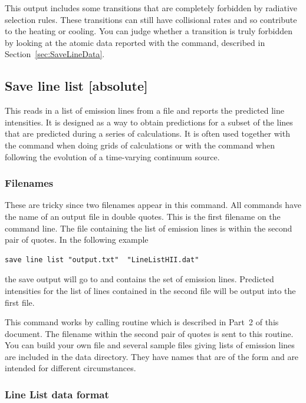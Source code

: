 This output includes some transitions that are completely forbidden by
radiative selection rules.  These transitions can still have collisional
rates and so contribute to the heating or cooling.  You can judge
whether a transition is truly forbidden by looking at the atomic data
reported with the  command, described in
Section~\ref{sec:SaveLineData}.

\subsection{Save line list [absolute]}
\label{sec:save_line_list}

This reads in a list of emission lines from a file and reports the
predicted line intensities.  It is designed as a way to obtain predictions
for a subset of the lines that are predicted during a series of calculations.
It is often used together with the  command
when doing grids of calculations or with the  command
when following the evolution of a time-varying
continuum source.

\subsubsection{Filenames}  
These are tricky since two filenames appear in this command.
All  commands have the name of an output file
in double quotes.
This is the first filename on the command line.
The file containing the list
of emission lines is within the second pair of quotes.  In the following
example
\begin{verbatim}
save line list "output.txt"  "LineListHII.dat"
\end{verbatim}
the save output will go to 
and  contains the
set of emission lines.
Predicted intensities for the list of lines contained
in the second file will be output into the first file.
 
This command works by calling routine 
which is described in Part~2 of this document.
The filename within the second pair of quotes
is sent to this routine.
You can build your own file and several sample
files giving lists of emission lines are included in the data directory.
They have names that are of the form 
and are intended for different circumstances.

\subsubsection{Line List data format}
\label{sec:LineListDataFormat}

